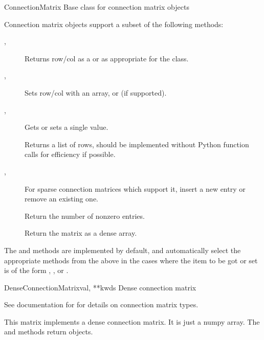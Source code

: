 \documentclass[letterpaper,10pt,english]{manual}
\begin{document}
\hypertarget{brian.ConnectionMatrix}{}\begin{classdesc}{ConnectionMatrix}{}
Base class for connection matrix objects

Connection matrix objects support a subset of the following methods:
\begin{description}
\item[, ]
Returns row/col  as a \hyperlink{brian.DenseConnectionVector}{} or
\hyperlink{brian.SparseConnectionVector}{} as appropriate for the class.

\item[, ]
Sets row/col with an array, \hyperlink{brian.DenseConnectionVector}{} or
\hyperlink{brian.SparseConnectionVector}{} (if supported).

\item[, ]
Gets or sets a single value.

\item[]
Returns a list of rows, should be implemented without Python
function calls for efficiency if possible.

\item[, ]
For sparse connection matrices which support it, insert a new
entry or remove an existing one.

\item[]
Return the number of nonzero entries.

\item[]
Return the matrix as a dense array.

\end{description}

The  and  methods are implemented by
default, and automatically select the appropriate methods from the
above in the cases where the item to be got or set is of the form
\code{:}, ,  or .
\end{classdesc}

\hypertarget{brian.DenseConnectionMatrix}{}\begin{classdesc}{DenseConnectionMatrix}{val, **kwds}
Dense connection matrix

See documentation for \hyperlink{brian.ConnectionMatrix}{} for details on
connection matrix types.

This matrix implements a dense connection matrix. It is just
a numpy array. The  and  methods return
 objects.
\end{classdesc}
\end{document}
